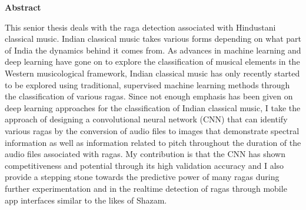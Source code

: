 \doublespacing
\setlength{\parindent}{1cm}

\begin{center}
  \textbf{Abstract}
\end{center}

This senior thesis deals with the raga detection associated with Hindustani classical music. Indian classical music takes various forms depending on what part of India the dynamics behind it comes from. As advances in machine learning and deep learning have gone on to explore the classification of musical elements in the Western musicological framework, Indian classical music has only recently started to be explored using traditional, supervised machine learning methods through the classification of various ragas. Since not enough emphasis has been given on deep learning approaches for the classification of Indian classical music, I take the approach of designing a convolutional neural network (CNN) that can identify various ragas by the conversion of audio files to images that demonstrate spectral information as well as information related to pitch throughout the duration of the audio files associated with ragas. My contribution is that the CNN has shown competitiveness and potential through its high validation accuracy and I also provide a stepping stone towards the predictive power of many ragas during further experimentation and in the realtime detection of ragas through mobile app interfaces similar to the likes of Shazam.  
